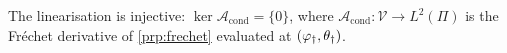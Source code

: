 %
%

\begin{assumption}\label{ass:completeness}
The linearisation is injective: $\ker\mathcal A_{\mathrm{cond}}=\{0\}$, where
$\mathcal A_{\mathrm{cond}}:\mathcal V\to L^{2}(\Pi)$ is the Fr\'echet derivative of
\cref{prp:frechet} evaluated at $(\varphi_{\dagger},\theta_\dagger)$.
\end{assumption}

